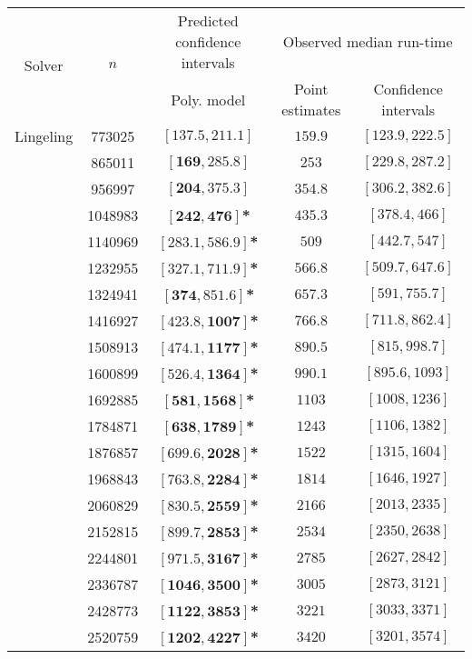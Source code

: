 \begin{tabular}{ccccc}
\hline 
\multirow{2}{*}{Solver} & \multirow{2}{*}{$n$} & Predicted confidence intervals & \multicolumn{2}{c}{Observed median  run-time}\tabularnewline
 &  & Poly. model  & Point estimates  & Confidence intervals\tabularnewline
\hline 
\hline 
\multirow{0}{*}{Lingeling} & 773025 & $\mathbf{\left[137.5,211.1\right]}$ & $159.9$ & $\left[123.9,222.5\right]$ \tabularnewline 
 & 865011 & $\mathbf{\left[169,285.8\right]}$ & $253$ & $\left[229.8,287.2\right]$ \tabularnewline 
 & 956997 & $\mathbf{\left[204,375.3\right]}$ & $354.8$ & $\left[306.2,382.6\right]$ \tabularnewline 
 & 1048983 & $\mathbf{\left[242,476\right]}$\textbf{*} & $435.3$ & $\left[378.4,466\right]$ \tabularnewline 
 & 1140969 & $\mathbf{\left[283.1,586.9\right]}$\textbf{*} & $509$ & $\left[442.7,547\right]$ \tabularnewline 
 & 1232955 & $\mathbf{\left[327.1,711.9\right]}$\textbf{*} & $566.8$ & $\left[509.7,647.6\right]$ \tabularnewline 
 & 1324941 & $\mathbf{\left[374,851.6\right]}$\textbf{*} & $657.3$ & $\left[591,755.7\right]$ \tabularnewline 
 & 1416927 & $\mathbf{\left[423.8,1007\right]}$\textbf{*} & $766.8$ & $\left[711.8,862.4\right]$ \tabularnewline 
 & 1508913 & $\mathbf{\left[474.1,1177\right]}$\textbf{*} & $890.5$ & $\left[815,998.7\right]$ \tabularnewline 
 & 1600899 & $\mathbf{\left[526.4,1364\right]}$\textbf{*} & $990.1$ & $\left[895.6,1093\right]$ \tabularnewline 
 & 1692885 & $\mathbf{\left[581,1568\right]}$\textbf{*} & $1103$ & $\left[1008,1236\right]$ \tabularnewline 
 & 1784871 & $\mathbf{\left[638,1789\right]}$\textbf{*} & $1243$ & $\left[1106,1382\right]$ \tabularnewline 
 & 1876857 & $\mathbf{\left[699.6,2028\right]}$\textbf{*} & $1522$ & $\left[1315,1604\right]$ \tabularnewline 
 & 1968843 & $\mathbf{\left[763.8,2284\right]}$\textbf{*} & $1814$ & $\left[1646,1927\right]$ \tabularnewline 
 & 2060829 & $\mathbf{\left[830.5,2559\right]}$\textbf{*} & $2166$ & $\left[2013,2335\right]$ \tabularnewline 
 & 2152815 & $\mathbf{\left[899.7,2853\right]}$\textbf{*} & $2534$ & $\left[2350,2638\right]$ \tabularnewline 
 & 2244801 & $\mathbf{\left[971.5,3167\right]}$\textbf{*} & $2785$ & $\left[2627,2842\right]$ \tabularnewline 
 & 2336787 & $\mathbf{\left[1046,3500\right]}$\textbf{*} & $3005$ & $\left[2873,3121\right]$ \tabularnewline 
 & 2428773 & $\mathbf{\left[1122,3853\right]}$\textbf{*} & $3221$ & $\left[3033,3371\right]$ \tabularnewline 
 & 2520759 & $\mathbf{\left[1202,4227\right]}$\textbf{*} & $3420$ & $\left[3201,3574\right]$ \tabularnewline 
\hline 
\end{tabular} 


